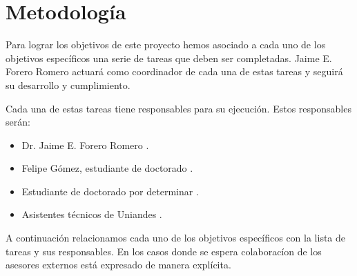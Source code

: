 
\section{Metodolog\'ia}
\label{metodologia}

Para lograr los objetivos de este proyecto hemos asociado a cada uno
de los objetivos espec\'ificos una serie de tareas que deben ser
completadas. Jaime E. Forero Romero actuar\'a como coordinador de cada
una de estas tareas y seguir\'a su desarrollo y cumplimiento. 

Cada una de estas tareas tiene responsables para su ejecuci\'on. Estos
responsables ser\'an:

\begin{itemize}
\item Dr. Jaime E. Forero Romero  \prof.
\item Felipe G\'omez, estudiante de doctorado \gradA.
\item Estudiante de doctorado por determinar \gradB.
\item Asistentes t\'ecnicos de Uniandes \tecn.
\end{itemize}


A continuaci\'on relacionamos cada uno de los objetivos espec\'ificos
con la lista de tareas y sus responsables. En los casos
donde se espera colaborac\'ion de los asesores externos est\'a
expresado de manera expl\'icita.

